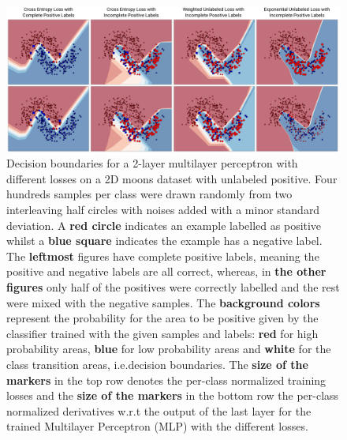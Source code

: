 \begin{figure}
\begin{center}
   \includegraphics[width=0.95\linewidth]{img/moons.png}
\end{center}
   \caption{Decision boundaries for a 2-layer multilayer perceptron with different losses on a 2D moons dataset with unlabeled positive. Four hundreds samples per class were drawn randomly from two interleaving half circles with noises added with a minor standard deviation. A \textbf{red circle} indicates an example labelled as positive whilst a \textbf{blue square} indicates the example has a negative label. The \textbf{leftmost} figures have complete positive labels, meaning the positive and negative labels are all correct, whereas, in \textbf{the other figures} only half of the positives were correctly labelled and the rest were mixed with the negative samples. The \textbf{background colors} represent the probability for the area to be positive given by the classifier trained with the given samples and labels: \textbf{red} for high probability areas, \textbf{blue} for low probability areas and \textbf{white} for the class transition areas, i.e.decision boundaries. The \textbf{size of the markers} in the top row denotes the per-class normalized training losses and the \textbf{size of the markers} in the bottom row the per-class normalized derivatives w.r.t the output of the last layer for the trained Multilayer Perceptron (MLP) with the different losses.}
\label{fig:moons}
\end{figure}



